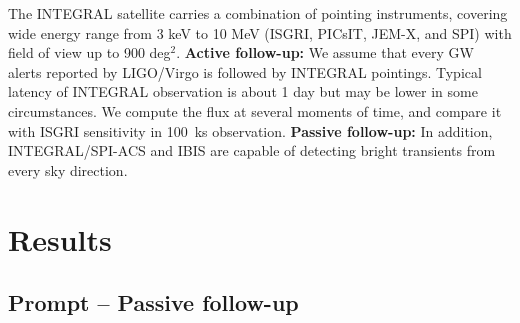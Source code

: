 \documentclass[a0,portrait]{a0poster}
\renewcommand{\emph}[1]{\textbf{\color{blue}#1}}
\newcommand{\ECM}[1] {\textbf{\textcolor{magenta}{#1}}}
\begin{document}
\begin{multicols}{2}

The INTEGRAL satellite carries a combination of pointing instruments, covering
wide energy range from 3 keV to 10 MeV (ISGRI, PICsIT, JEM-X, and SPI) with
field of view up to 900 deg$^2$. \emph{Active follow-up:} We assume that every
GW alerts reported by LIGO/Virgo is followed by INTEGRAL pointings. Typical
latency of INTEGRAL observation is about 1 day but may be lower in some
circumstances. We compute the flux at several moments of time, and compare it
with ISGRI sensitivity in 100~ks observation. \emph{Passive follow-up:} In
addition, INTEGRAL/SPI-ACS and IBIS are capable of detecting bright transients
from every sky direction.


\section*{Results}

\subsection*{Prompt -- Passive follow-up}


\end{multicols}
\end{document}
